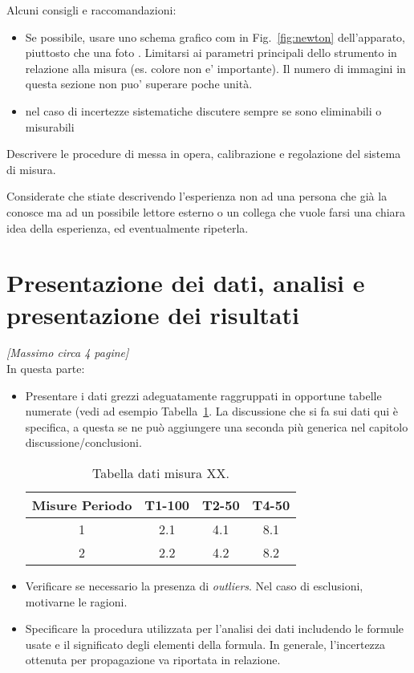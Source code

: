 \documentclass[a4paper, 11pt]{article}
\begin{document}
{		
		Alcuni consigli e raccomandazioni:
		\begin{itemize}
			\item Se possibile, usare uno schema grafico com in Fig.~\ref{fig:newton} dell'apparato, piuttosto che una foto . Limitarsi ai parametri principali dello strumento in relazione alla misura (es. colore non e' importante). Il numero di immagini in questa sezione non puo' superare poche unit\`a. 
			\item nel caso di incertezze sistematiche discutere sempre se sono eliminabili o misurabili
		\end{itemize}
		
		Descrivere le procedure di messa in opera, calibrazione e regolazione del sistema di misura.
		
		Considerate che stiate descrivendo l'esperienza non ad una persona che gi\`a la conosce ma ad un possibile lettore esterno o un collega che vuole farsi una chiara idea della esperienza, ed eventualmente ripeterla. 
		
		
		
		
		\section[Analisi]{Presentazione dei dati, analisi e presentazione dei risultati}
		\textit{[Massimo circa 4 pagine]}\\
		In questa parte:
		\begin{itemize}
			\item Presentare i dati grezzi adeguatamente raggruppati in opportune tabelle numerate (vedi ad esempio Tabella~\ref{tab:mia_tabella}. La discussione che si fa sui dati qui \`e specifica, a questa se ne pu\`o aggiungere una seconda pi\`u generica nel capitolo discussione/conclusioni. 
			\begin{table}[h!t]
				\centering
				\begin{tabular}{c|ccc}
					\hline
					Misure Periodo  & T1-100  & T2-50 & T4-50\\
					\hline
					1 & 2.1 & 4.1 & 8.1\\
					2 & 2.2 & 4.2 & 8.2\\
					\hline
				\end{tabular}
				\caption{Tabella dati misura XX. }
				\label{tab:mia_tabella}
			\end{table}
			\item Verificare se necessario la presenza di \emph{outliers}. Nel caso di esclusioni, motivarne le ragioni.
			\item Specificare la procedura utilizzata per l'analisi dei dati includendo le formule usate e il significato degli elementi della formula. In generale, l'incertezza ottenuta per propagazione va riportata in relazione.
			

\end{itemize}}
\end{document}
